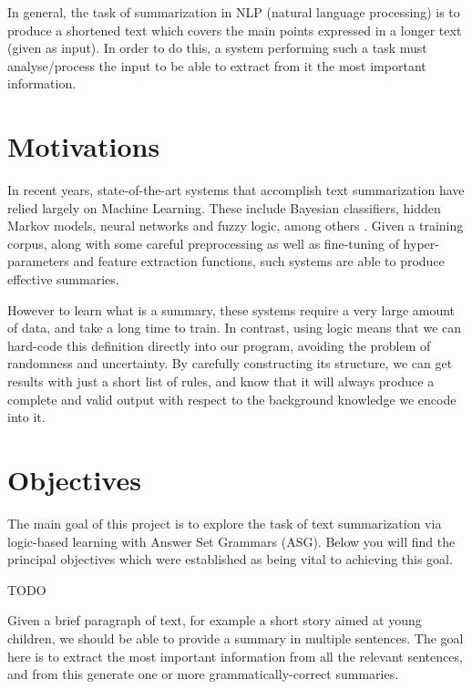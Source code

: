 \label{chapter:introduction}

In general, the task of summarization in NLP (natural language processing) is to produce a shortened text which covers the main points expressed in a longer text (given as input). In order to do this, a system performing such a task must analyse/process the input to be able to extract from it the most important information.

\section{Motivations}

In recent years, state-of-the-art systems that accomplish text summarization have relied largely on Machine Learning. These include Bayesian classifiers, hidden Markov models, neural networks and fuzzy logic, among others \cite{kiyani_survey_2017}. Given a training corpus, along with some careful preprocessing as well as fine-tuning of hyper-parameters and feature extraction functions, such systems are able to produce effective summaries. 

However to learn what is a summary, these systems require a very large amount of data, and take a long time to train. In contrast, using logic means that we can hard-code this definition directly into our program, avoiding the problem of randomness and uncertainty. By carefully constructing its structure, we can get results with just a short list of rules, and know that it will always produce a complete and valid output with respect to the background knowledge we encode into it.

\section{Objectives}

The main goal of this project is to explore the task of text summarization via logic-based learning with Answer Set Grammars (ASG). Below you will find the principal objectives which were established as being vital to achieving this goal.

\begin{objective}[TODO]
TODO
\end{objective}

Given a brief paragraph of text, for example a short story aimed at young children, we should be able to provide a summary in multiple sentences. The goal here is to extract the most important information from all the relevant sentences, and from this generate one or more grammatically-correct summaries.

